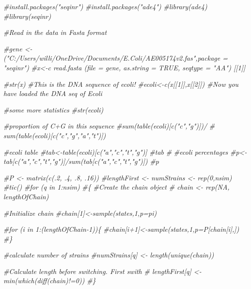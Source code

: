 \documentclass[
]{article}
\newenvironment{Shaded}{\begin{snugshade}}{\end{snugshade}}
\newcommand{\CommentTok}[1]{\textcolor[rgb]{0.56,0.35,0.01}{\textit{#1}}}
\newcommand{\DecValTok}[1]{\textcolor[rgb]{0.00,0.00,0.81}{#1}}
\newcommand{\FloatTok}[1]{\textcolor[rgb]{0.00,0.00,0.81}{#1}}
\newcommand{\KeywordTok}[1]{\textcolor[rgb]{0.13,0.29,0.53}{\textbf{#1}}}
\newcommand{\NormalTok}[1]{#1}
\newcommand{\StringTok}[1]{\textcolor[rgb]{0.31,0.60,0.02}{#1}}
\begin{document}
\begin{Shaded}
\begin{Highlighting}[]
\CommentTok{#install.packages("seqinr")}
\CommentTok{#install.packages("ade4")}
\CommentTok{#library(ade4)}
\CommentTok{#library(seqinr)}

\CommentTok{#Read in the data in Fasta format}


\CommentTok{#gene <- ("C:/Users/willi/OneDrive/Documents/E.Coli/AE005174v2.fas",package = "seqinr") }
\CommentTok{#x<-c read.fasta (file = gene, as.string = TRUE, seqtype = "AA") [[1]]}

\CommentTok{#str(x)}
\CommentTok{#This is the DNA sequence of ecoli!}
\CommentTok{#ecoli<-c(x[[1]],x[[2]]) #Now you have loaded the DNA seq of Ecoli}



\CommentTok{#some more statistics}
\CommentTok{#str(ecoli)}

\CommentTok{#proportion of C+G in this sequence}
\CommentTok{#sum(table(ecoli)[c("c","g")])/}
 \CommentTok{# sum(table(ecoli)[c("c","g","a","t")])}

\CommentTok{#ecoli table}
\CommentTok{#tab<-table(ecoli)[c("a","c","t","g")]}
\CommentTok{#tab}
\CommentTok{#}
\CommentTok{#ecoli percentages}
\CommentTok{#p<-tab[c("a","c","t","g")]/sum(tab[c("a","c","t","g")])}
\CommentTok{#p}

\CommentTok{#P <- matrix(c(.2, .4, .8, .16))}
\CommentTok{#lengthFirst <- numStrains <- rep(0,nsim)}
\CommentTok{#tic()}
\CommentTok{#for (q in 1:nsim)}
\CommentTok{#\{}
  \CommentTok{#Create the chain object}
 \CommentTok{# chain <- rep(NA, lengthOfChain)}
  
  \CommentTok{#Initialize chain}
  \CommentTok{#chain[1]<-sample(states,1,p=pi)}
  
  \CommentTok{#for (i in 1:(lengthOfChain-1))\{}
    \CommentTok{#chain[i+1]<-sample(states,1,p=P[chain[i],])}
  \CommentTok{#\}}
  
  \CommentTok{#calculate number of strains}
  \CommentTok{#numStrains[q] <- length(unique(chain))}
  
  \CommentTok{#Calculate length before switching. First swith}
 \CommentTok{# lengthFirst[q] <- min(which(diff(chain)!=0))}
\CommentTok{#\}}
\end{Highlighting}
\end{Shaded}

\begin{Shaded}
\end{Shaded}
\end{document}
